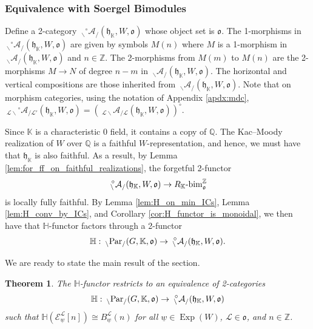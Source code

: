 \documentclass{amsart}
\newcommand{\Q}{\mathbb{Q}}
\newcommand{\Z}{\mathbb{Z}}
\newcommand{\K}{\mathbb{K}}
\renewcommand{\H}{\mathbb{H}}
\newcommand{\scrE}{\mathcal{E}}
\newcommand{\scrL}{\mathcal{L}}
\newcommand{\grbim}[1]{#1\textnormal{-bim}^{\Z}}
\newcommand{\fr}[1]{\mathfrak{#1}}
\newcommand{\PEE}[2]{\:_{#1 \backslash} \textnormal{Par}_{/ #2} }
\newcommand{\Amon}[2]{\:_{#1 \backslash} \mathcal{A}_{/ #2} }
\newcommand{\grAmon}[2]{\:_{#1 \backslash} \!\! {}^{\circ} \mathcal{A}_{/ #2} }
\DeclareMathOperator{\Exp}{Exp}
\newcommand{\uw}{\underline{w}}
\newtheorem{theorem}[subsubsection]{Theorem}
\theoremstyle{definition}
\numberwithin{equation}{subsection}
\begin{document}
\subsubsection{Equivalence with Soergel Bimodules}

Define a 2-category $\grAmon{}{} (\fr{h}_{\K}, W, \fr{o})$ whose object set is $\fr{o}$. The 1-morphisms in $\grAmon{}{} (\fr{h}_{\K}, W, \fr{o})$ are given by symbols $M(n)$ where $M$ is a 1-morphism in $\Amon{}{} (\fr{h}_{\K}, W, \fr{o})$ and $n \in \Z$.
The 2-morphisms from $M(m)$ to $M(n)$ are the 2-morphisms $M \to N$ of degree $n-m$ in $\Amon{}{} (\fr{h}_{\K}, W, \fr{o})$. The horizontal and vertical compositions are those inherited from $\Amon{}{} (\fr{h}_{\K}, W, \fr{o})$.
Note that on morphism categories, using the notation of Appendix \ref{apdx:mdc}, $\grAmon{\scrL}{\scrL'} (\fr{h}_{\K}, W, \fr{o}) = \left( \Amon{\scrL}{\scrL} (\fr{h}_{\K}, W, \fr{o}) \right)^{\circ}$.

Since $\K$ is a characteristic 0 field, it contains a copy of $\Q$. The Kac--Moody realization of $W$ over $\Q$ is a faithful $W$-representation, and hence, we must have that $\fr{h}_{\K}$ is also faithful.
As a result, by Lemma \ref{lem:for_ff_on_faithful_realizations}, the forgetful 2-functor
\[\grAmon{}{} (\fr{h}_{\K}, W, \fr{o}) \to \grbim{R_{\K} }_{\fr{o}}\] 
is locally fully faithful. By Lemma \ref{lem:H_on_min_ICs}, Lemma \ref{lem:H_conv_by_ICs}, and Corollary \ref{cor:H_functor_is_monoidal}, we then have that $\H$-functor factors through a 2-functor
\[\H : \PEE{}{} (G, \K, \fr{o}) \to \grAmon{}{} (\fr{h}_{\K}, W, \fr{o}).\]

We are ready to state the main result of the section.

\begin{theorem}\label{thm:H_functor_properties}
  The $\H$-functor restricts to an equivalence of 2-categories
  \[\H : \PEE{}{} (G, \K, \fr{o}) \to \grAmon{}{} (\fr{h}_{\K}, W, \fr{o})\]
  such that $\H (\scrE_{\uw}^{\scrL} [n]) \cong B_{\uw}^{\scrL} (n)$ for all $\uw \in \Exp (W)$, $\scrL \in \fr{o}$, and $n \in \Z$.
\end{theorem}
\end{document}
